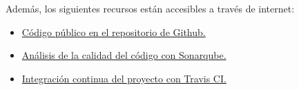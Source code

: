 Además, los siguientes recursos están accesibles a través de internet:

\begin{itemize}
	\tightlist
	\item
	\href{https://github.com/trona85/GII-17.1B-UBULog-1.0}{Código público en el repositorio de Github.}
	\item
	\href{https://sonarcloud.io/dashboard?id=GII-17.1B-UBULog-1.0}{Análisis de la calidad del código con Sonarqube.}
	\item
	\href{https://travis-ci.org/trona85/GII-17.1B-UBULog-1.0/}{Integración continua del proyecto con Travis CI.}
	
\end{itemize}



